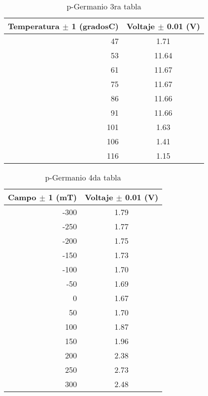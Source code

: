 \documentclass[aps,prl,reprint]{revtex4-1}
\begin{document}
\begin{table}[H]
\begin{center}
\begin{tabular}
{|| r || c ||} 
\hline\hline
Temperatura $\pm$ 1 (gradosC) & Voltaje $\pm$ 0.01 (V)\\  

\hline

47 & 1.71 \\
53 & 11.64 \\
61 & 11.67 \\
75 & 11.67\\
86 & 11.66\\
91 & 11.66\\
101 & 1.63 \\
106 & 1.41\\
116 & 1.15 \\


\hline\hline
\end{tabular}
\end{center}
\caption{p-Germanio 3ra tabla}
\label{3p}
\end{table}


\begin{table}[H]
\begin{center}
\begin{tabular}
{|| r || c ||} 
\hline\hline
Campo $\pm$ 1 (mT) & Voltaje $\pm$ 0.01 (V) \\   

\hline

-300 & 1.79\\
-250 & 1.77 \\
-200 & 1.75 \\
-150 & 1.73 \\
-100 & 1.70 \\
-50 & 1.69 \\
0 & 1.67 \\
50 & 1.70\\
100 & 1.87 \\
150 & 1.96\\
200 & 2.38 \\
250 & 2.73\\
300 & 2.48 \\


\hline\hline
\end{tabular}
\end{center}
\caption{p-Germanio 4da tabla}
\label{4p}
\end{table}
\end{document}
